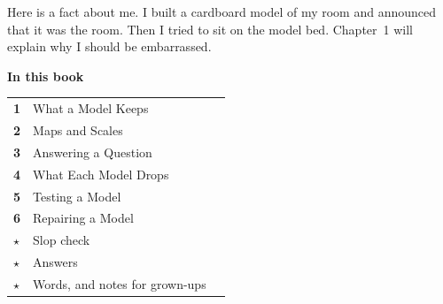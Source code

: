 \begin{multix}[hmm]\multixbot[hmm]\tcblower
Here is a fact about me. I built a cardboard model of my room and announced that it was the room. Then I tried to sit on the model bed. Chapter~1 will explain why I should be embarrassed.
\end{multix}
\clearpage

\thispagestyle{plain}
{\sans\bfseries\LARGE\color{ink} In this book}\par\vspace{0.2cm}
{\sans\large
\begin{tabular}{@{}p{0.9cm}p{7.6cm}r@{}}
\textcolor{tangerine}{\bfseries 1} & What a Model Keeps & \pageref{ch1}\\[3pt]
\textcolor{tangerine}{\bfseries 2} & Maps and Scales & \pageref{ch2}\\[3pt]
\textcolor{tangerine}{\bfseries 3} & Answering a Question & \pageref{ch3}\\[3pt]
\textcolor{tangerine}{\bfseries 4} & What Each Model Drops & \pageref{ch4}\\[3pt]
\textcolor{tangerine}{\bfseries 5} & Testing a Model & \pageref{ch5}\\[3pt]
\textcolor{tangerine}{\bfseries 6} & Repairing a Model & \pageref{ch6}\\[3pt]
\textcolor{sky}{\bfseries $\star$} & Slop check & \pageref{slop}\\[3pt]
\textcolor{sky}{\bfseries $\star$} & Answers & \pageref{answers}\\[3pt]
\textcolor{sky}{\bfseries $\star$} & Words, and notes for grown-ups & \pageref{notes}\\
\end{tabular}}


